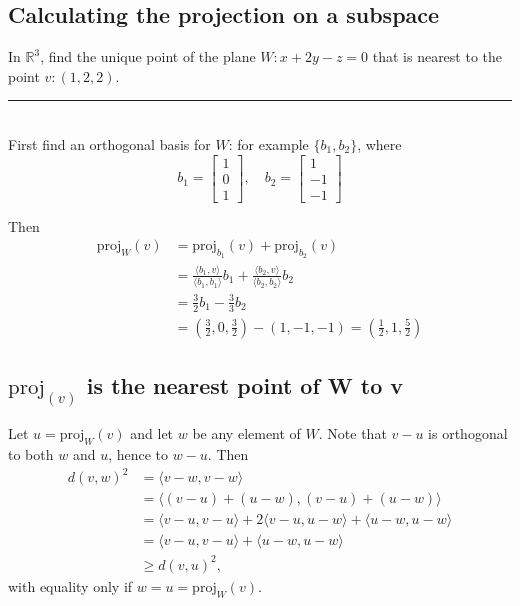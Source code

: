 \documentclass[a4paper, 9pt]{extarticle}
\begin{document}
\subsection{Calculating the projection on a subspace}
\begin{examplebox}
  In $\mathbb{R}^3$, find the unique point of the plane $W : x + 2y - z = 0$
  that is nearest to the point $v : (1, 2, 2)$.
  \\ \rule{\textwidth}{1pt}\\
  First find an orthogonal basis for $W$: for example $\{b_1, b_2\}$, where
  $$
    b_1 = \begin{bmatrix} 1 \\ 0 \\ 1 \end{bmatrix}, \quad
    b_2 = \begin{bmatrix} 1 \\ -1 \\ -1 \end{bmatrix}
  $$

  Then
  \begin{align*}
    \text{proj}_W(v) & = \text{proj}_{b_1}(v) + \text{proj}_{b_2}(v)                                                                               \\
                     & = \frac{\langle b_1, v \rangle}{\langle b_1, b_1 \rangle} b_1 + \frac{\langle b_2, v \rangle}{\langle b_2, b_2 \rangle} b_2 \\
                     & = \frac{3}{2} b_1 - \frac{3}{3} b_2                                                                                         \\
                     & = \left( \frac{3}{2}, 0, \frac{3}{2} \right) - (1, -1, -1) = \left( \frac{1}{2}, 1, \frac{5}{2} \right)
  \end{align*}
\end{examplebox}
\subsection{$\text{proj}_{(v)}$ is the nearest point of W to v}
Let $u = \text{proj}_W(v)$ and let $w$ be any element of $W$.
Note that $v - u$ is orthogonal to both $w$ and $u$, hence to $w - u$. Then
\begin{align*}
  d(v, w)^2 & = \langle v - w, v - w \rangle                                                                 \\
            & = \langle (v - u) + (u - w), (v - u) + (u - w) \rangle                                         \\
            & = \langle v - u, v - u \rangle + 2 \langle v - u, u - w \rangle + \langle u - w, u - w \rangle \\
            & = \langle v - u, v - u \rangle + \langle u - w, u - w \rangle                                  \\
            & \geq d(v, u)^2,
\end{align*}
with equality only if $w = u = \text{proj}_W(v)$.
\end{document}
